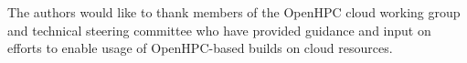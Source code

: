 \documentclass[sigconf,screen]{acmart}
\begin{document}
\begin{acks}
The authors would like to thank members of the OpenHPC cloud working group and
technical steering committee who have provided guidance and input on efforts to
enable usage of OpenHPC-based builds on cloud resources.
\end{acks}

\nocite{*}



\end{document}
